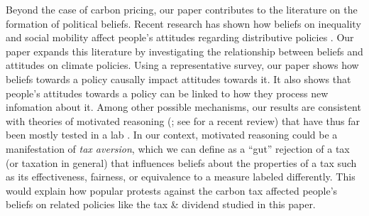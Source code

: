 \documentclass[12pt]{article} %
\begin{document}
Beyond the case of carbon pricing, our paper contributes to the literature on the formation of political beliefs. Recent research has shown how beliefs on inequality and social mobility affect people's attitudes regarding distributive policies \citep[e.g.,][]{cruces_et_al_2013,kuziemko_et_al_2015,alesina_intergenerational_2018}. Our paper expands this literature by investigating the relationship between beliefs and attitudes on climate policies. Using a representative survey, our paper shows how beliefs towards a policy causally impact attitudes towards it. It also shows that people's attitudes towards a policy can be linked to how they process new infomation about it. Among other possible mechanisms, our results are consistent with theories of motivated reasoning (\citet{ziva_kunda_case_1990}; see \citet{benabou_mindful_2016} for a recent review) that have thus far been mostly tested in a lab \citep[e.g.,][]{redlawsk_hot_2002,thaler_2019}. In our context, motivated reasoning could be a manifestation of \textit{tax aversion}, which we can define as a ``gut'' rejection of a tax (or taxation in general) that influences beliefs about the properties of a tax such as its effectiveness, fairness, or equivalence to a measure labeled differently. This would explain how popular protests against the carbon tax affected people's beliefs on related policies like the tax \& dividend studied in this paper.


\end{document}
